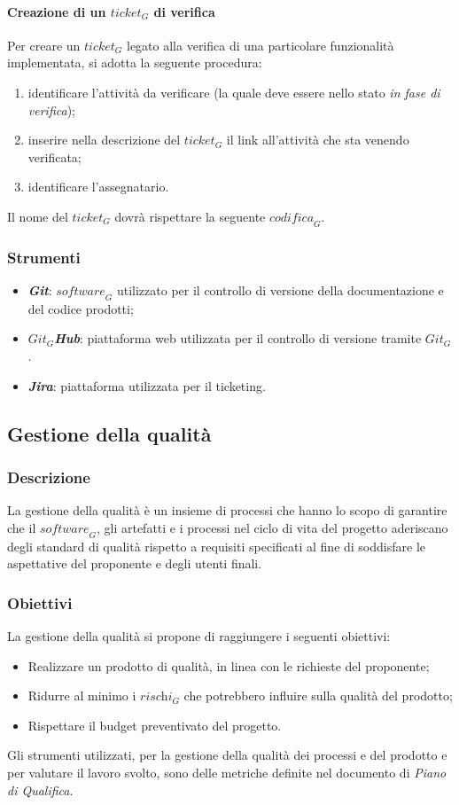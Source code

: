 \paragraph{Creazione di un $\textit{ticket}_G$ di verifica}
Per creare un $\textit{ticket}_G$ legato alla verifica di una particolare funzionalità implementata, si adotta la seguente procedura:
\begin{enumerate}
    \item identificare l'attività da verificare (la quale deve essere nello stato \emph{in fase di verifica});
    \item inserire nella descrizione del $\textit{ticket}_G$ il link all'attività che sta venendo verificata;
    \item identificare l'assegnatario.
\end{enumerate}
Il nome del $\textit{ticket}_G$ dovrà rispettare la seguente $\textit{codifica}_G$.

\subsubsection{Strumenti}
\begin{itemize}
    \item \emph{\textbf{Git}}: $\textit{software}_G$ utilizzato per il controllo di versione della documentazione e del codice prodotti;
    \item \emph{\textbf{$\textit{Git}_G$Hub}}: piattaforma web utilizzata per il controllo di versione tramite $\textit{Git}_G$.
    \item \emph{\textbf{Jira}}: piattaforma utilizzata per il ticketing.
\end{itemize}
\subsection{Gestione della qualità}
\subsubsection{Descrizione}
La gestione della qualità è un insieme di processi che hanno lo scopo di garantire che il $\textit{software}_G$, gli artefatti e i processi nel ciclo di vita del progetto aderiscano degli standard di qualità rispetto a requisiti specificati al fine di soddisfare le aspettative del proponente e degli utenti finali.
\subsubsection{Obiettivi}
La gestione della qualità si propone di raggiungere i seguenti obiettivi:
\begin{itemize}
    \item Realizzare un prodotto di qualità, in linea con le richieste del proponente;
    \item Ridurre al minimo i $\textit{rischi}_G$ che potrebbero influire sulla qualità del prodotto;
    \item Rispettare il budget preventivato del progetto.
\end{itemize}
Gli strumenti utilizzati, per la gestione della qualità dei processi e del prodotto e per valutare il lavoro svolto, sono delle metriche definite nel documento di \emph{Piano di Qualifica}. 
